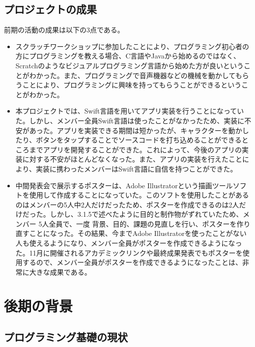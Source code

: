 \documentclass[openany,11pt,papersize]{jsbook}
\begin{document}
\section{プロジェクトの成果}
\par 前期の活動の成果は以下の3点である。
\begin{itemize}
\item スクラッチワークショップに参加したことにより、プログラミング初心者の方にプログラミングを教える場合、C言語やJavaから始めるのではなく、Scratchのようなビジュアルプログラミング言語から始めた方が良いということがわかった。また、プログラミングで音声機器などの機械を動かしてもらうことにより、プログラミングに興味を持ってもらうことができるということがわかった。
\item 
本プロジェクトでは、Swift言語を用いてアプリ実装を行うことになっていた。しかし、メンバー全員Swift言語は使ったことがなかったため、実装に不安があった。アプリを実装できる期間は短かったが、キャラクターを動かしたり、ボタンをタップすることでソースコードを打ち込めることができるところまでアプリを開発することができた。これによって、今後のアプリの実装に対する不安がほとんどなくなった。また、アプリの実装を行えたことにより、実装に携わったメンバーはSwift言語に自信を持つことができた。

\item 中間発表会で展示するポスターは、Adobe Illustratorという描画ツールソフトを使用して作成することになっていた。このソフトを使用したことがあるのはメンバーの5人中2人だけだったため、ポスターを作成できるのは2人だけだった。しかし、3.1.5で述べたように目的と制作物がずれていたため、メンバー 5人全員で、一度 背景、目的、課題の見直しを行い、ポスターを作り直すことになった。その結果、今までAdobe Illustratorを使ったことがない人も使えるようになり、メンバー全員がポスターを作成できるようになった。11月に開催されるアカデミックリンクや最終成果発表でもポスターを使用するので、メンバー全員がポスターを作成できるようになったことは、非常に大きな成果である。
\end{itemize}




\chapter{後期の背景}

\section{プログラミング基礎の現状}
\end{document}
